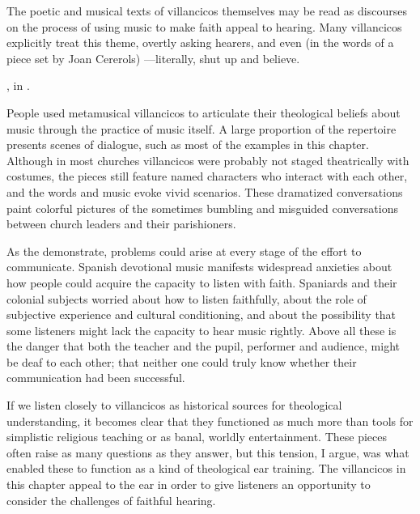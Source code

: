 The poetic and musical texts of villancicos themselves may be read as discourses
on the process of using music to make faith appeal to hearing.
Many villancicos explicitly treat this theme, overtly asking hearers,
  and even (in the words of a piece set
by Joan Cererols) ---literally, shut up and believe.%
\begin{Footnote}
    , in
    \autocite[205--212]{Cererols:MEM-VC}.
\end{Footnote}
People used metamusical villancicos to articulate their theological beliefs
about music through the practice of music itself.
A large proportion of the repertoire presents scenes of dialogue, such as most
of the examples in this chapter.
Although in most churches villancicos were probably not staged theatrically with
costumes, the pieces still feature named characters who interact with each
other, and the words and music evoke vivid scenarios.
These dramatized conversations paint colorful pictures of the sometimes bumbling
and misguided conversations between church leaders and their parishioners.

As the  demonstrate, problems could arise at
every stage of the effort to communicate.
Spanish devotional music manifests widespread anxieties about how people could
acquire the capacity to listen with faith.
Spaniards and their colonial subjects worried about how to listen faithfully,
about the role of subjective experience and cultural conditioning, and about the
possibility that some listeners might lack the capacity to hear music rightly.
Above all these is the danger that both the teacher and the pupil, performer and
audience, might be deaf to each other; that neither one could truly know whether
their communication had been successful.

If we listen closely to villancicos as historical sources for theological
understanding, it becomes clear that they functioned as much more than tools for
simplistic religious teaching or as banal, worldly entertainment.
These pieces often raise as many questions as they answer, but this tension, I
argue, was what enabled these to function as a kind of theological ear training.
The villancicos in this chapter appeal to the ear in order to give listeners an
opportunity to consider the challenges of faithful hearing.

\section{}

